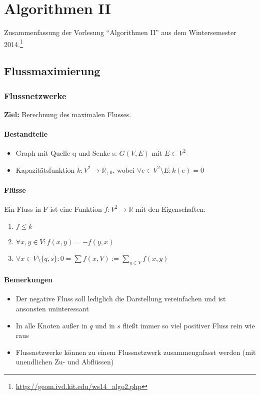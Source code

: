 \chapter{Algorithmen II}

Zusammenfassung der Vorlesung "`Algorithmen II"' aus dem Wintersemester 2014.\footnote{\url{http://geom.ivd.kit.edu/ws14_algo2.php}}


\section{Flussmaximierung}

\subsection{Flussnetzwerke}
\textbf{Ziel:} Berechnung des maximalen Flusses.

\subsubsection{Bestandteile}
\begin{itemize}
	\item Graph mit Quelle q und Senke s: \(G(V,E)\) mit \(E \subset V^2\)
	\item Kapazitätsfunktion \(k : V^2 \rightarrow \mathbb{R}_{+0}\), wobei \(\forall e \in V^2 \setminus E: k(e) = 0\)
\end{itemize}

\subsubsection{Flüsse}
Ein Fluss in F ist eine Funktion \(f:V^2\rightarrow\mathbb{R}\) mit den Eigenschaften:
\begin{enumerate}
	\item \(f \leq k\)
	\item \(\forall x,y \in V : f(x,y) = -f(y,x)\)
	\item \(\forall x \in V \setminus \{ q,s \}: 0 = \sum f(x,V) := \sum_{y\in V} f(x,y)\)
\end{enumerate}

\subsubsection{Bemerkungen}
\begin{itemize}
	\item Der negative Fluss soll lediglich die Darstellung vereinfachen und ist ansonsten uninteressant
	\item In alle Knoten außer in \(q\) und in \(s\) fließt immer so viel positiver Fluss rein wie raus
	\item Flussnetzwerke können zu einem Flussnetzwerk zusammengafasst werden (mit unendlichen Zu- und Abflüssen)
\end{itemize}


